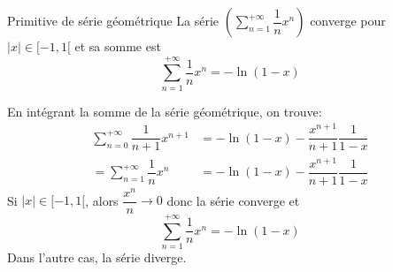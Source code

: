 \documentclass[a4paper, 12pt]{article}
\begin{document}
\begin{proposition}{Primitive de série géométrique}{}
    La série $(\sum\limits_{n=1}^{+\infty}\dfrac{1}{n}x^n)$ converge pour $|x| \in [-1, 1[$ et sa somme est
    $$
    \sum\limits_{n=1}^{+\infty}\dfrac{1}{n}x^n = -\ln(1 - x)
    $$
\end{proposition}

\begin{demonstration}
    En intégrant la somme de la série géométrique, on trouve:
    \begin{align*}
        \sum\limits_{n=0}^{+\infty}\dfrac{1}{n+1}x^{n+1} &= -\ln(1 - x) - \dfrac{x^{n+1}}{n+1}\dfrac{1}{1 - x}\\
        = \sum\limits_{n=1}^{+\infty}\dfrac{1}{n}x^{n} &= -\ln(1 - x) - \dfrac{x^{n+1}}{n+1}\dfrac{1}{1 - x}
    \end{align*}
    Si $|x| \in [-1, 1[$, alors $\dfrac{x^n}{n} \rightarrow 0$ donc la série converge et
    $$
    \sum\limits_{n=1}^{+\infty}\dfrac{1}{n}x^{n} = -\ln(1 - x)
    $$
    Dans l'autre cas, la série diverge.
\end{demonstration}
\end{document}
